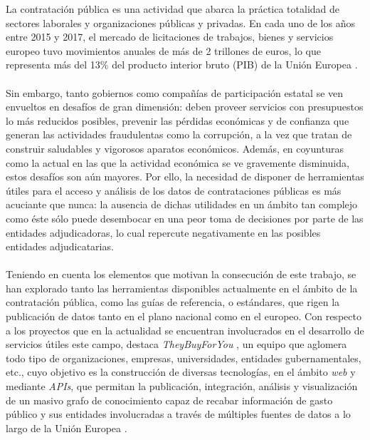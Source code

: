 
    La contratación pública es una actividad que abarca la práctica totalidad de sectores laborales y organizaciones públicas y privadas. En cada uno de los años entre 2015 y 2017, el mercado de licitaciones de trabajos, bienes y servicios europeo tuvo movimientos anuales de más de 2 trillones de euros, lo que representa más del 13\% del producto interior bruto (PIB) de la Unión Europea \cite{UEGDP1} \cite{UEGDP2}.
    \\ \\
    Sin embargo, tanto gobiernos como compañías de participación estatal se ven envueltos en desafíos de gran dimensión: deben proveer servicios con presupuestos lo más reducidos posibles, prevenir las pérdidas económicas y de confianza que generan las actividades fraudulentas como la corrupción, a la vez que tratan de construir saludables y vigorosos aparatos económicos. Además, en coyunturas como la actual en las que la actividad económica se ve gravemente disminuida, estos desafíos son aún mayores. Por ello, la necesidad de disponer de herramientas útiles para el acceso y análisis de los datos de contrataciones públicas es más acuciante que nunca: la ausencia de dichas utilidades en un ámbito tan complejo como éste sólo puede desembocar en una peor toma de decisiones por parte de las entidades adjudicadoras, lo cual repercute negativamente en las posibles entidades adjudicatarias.
    \\ \\
    Teniendo en cuenta los elementos que motivan la consecución de este trabajo, se han explorado tanto las herramientas disponibles actualmente en el ámbito de la contratación pública, como las guías de referencia, o estándares, que rigen la publicación de datos tanto en el plano nacional como en el europeo. Con respecto a los proyectos que en la actualidad se encuentran involucrados en el desarrollo de servicios útiles este campo, destaca \textit{TheyBuyForYou} \cite{TBFY}, un equipo que aglomera todo tipo de organizaciones, empresas, universidades, entidades gubernamentales, etc., cuyo objetivo es la construcción de diversas tecnologías, en el ámbito \textit{web} y mediante \textit{APIs}, que permitan la publicación, integración, análisis y visualización de un masivo grafo de conocimiento capaz de recabar información de gasto público y sus entidades involucradas a través de múltiples fuentes de datos a lo largo de la Unión Europea \cite{TBFYPAPER}.
    \\ \\

